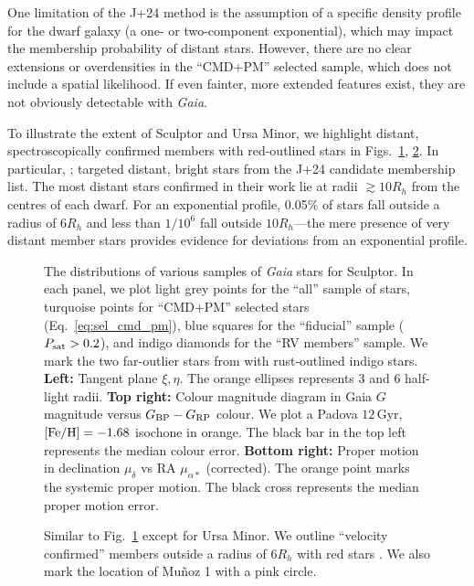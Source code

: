 One limitation of the J+24 method is the assumption of a specific
density profile for the dwarf galaxy (a one- or two-component
exponential), which may impact the membership probability of distant
stars. However, there are no clear extensions or overdensities in the
``CMD+PM'' selected sample, which does not include a spatial likelihood.
If even fainter, more extended features exist, they are not obviously
detectable with \emph{Gaia}.

To illustrate the extent of Sculptor and Ursa Minor, we highlight
distant, spectroscopically confirmed members with red-outlined stars in
Figs.~\ref{fig:scl_selection}, \ref{fig:umi_selection}. In particular,
\citet{sestito+2023a}; \citet{sestito+2023b} targeted distant, bright
stars from the J+24 candidate membership list. The most distant stars
confirmed in their work lie at radii \(\gtrsim 10 R_h\) from the centres
of each dwarf. For an exponential profile, 0.05\% of stars fall outside
a radius of \(6R_h\) and less than \(1/10^6\) fall outside
\(10R_h\)---the mere presence of very distant member stars provides
evidence for deviations from an exponential profile.

\begin{figure}
\centering
{}
\caption[Sculptor sample selection]{The distributions of various samples
of \emph{Gaia} stars for Sculptor. In each panel, we plot light grey
points for the ``all'' sample of stars, turquoise points for ``CMD+PM''
selected stars (Eq.~\ref{eq:sel_cmd_pm}), blue squares for the
``fiducial'' sample (\(P_{\rm sat} > 0.2\)), and indigo diamonds for the
``RV members'' sample. We mark the two far-outlier stars from
\citet{sestito+2023a} with rust-outlined indigo stars. \textbf{Left:}
Tangent plane \(\xi, \eta\). The orange ellipses represents 3 and 6
half-light radii. \textbf{Top right:} Colour magnitude diagram in Gaia
\(G\) magnitude versus \(G_{\rm BP} - G_{\rm RP}\) colour. We plot a
Padova \(12\,\)Gyr, \({\rm [Fe/H] }=-1.68\) isochone in orange. The
black bar in the top left represents the median colour error.
\textbf{Bottom right:} Proper motion in declination \(\mu_\delta\) vs RA
\(\mu_{\alpha*}\) (corrected). The orange point marks the systemic
\citet{MV2020b} proper motion. The black cross represents the median
proper motion error.}\label{fig:scl_selection}
\end{figure}

\begin{figure}
\centering
{}
\caption[Ursa Minor sample selection]{Similar to
Fig.~\ref{fig:scl_selection} except for Ursa Minor. We outline
``velocity confirmed'' members outside a radius of \(6R_h\) with red
stars \citep[from][]{sestito+2023b, pace+2020, spencer+2018}. We also
mark the location of Muñoz 1 with a pink
circle.}\label{fig:umi_selection}
\end{figure}

